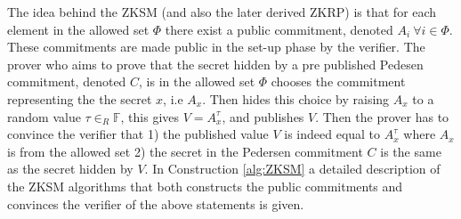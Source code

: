 The idea behind the ZKSM (and also the later derived ZKRP) is that for each element in the allowed set $\Phi$ there exist a public commitment, denoted $A_i\: \forall i\in\Phi$.  These commitments are made public in the set-up phase by the verifier. The prover who aims to prove that the secret hidden by a pre published Pedesen commitment, denoted $C$, is in the allowed set $\Phi$ chooses the commitment representing the the secret $x$, i.e $A_x$. Then hides this choice by raising $A_x$  to a random value $\tau\in_R\mathds{F}$, this gives $V = A_x^\tau$, and publishes $V$. Then the prover has to convince the verifier that  1) the published value $V$ is indeed equal to  $A_x^\tau$ where $A_x$ is from the allowed set  2) the secret in the Pedersen commitment $C$  is the same as the secret hidden by $V$.
In Construction \ref{alg:ZKSM}  a detailed description of the ZKSM algorithms that both constructs the public commitments and convinces the verifier of the above statements is given. 
